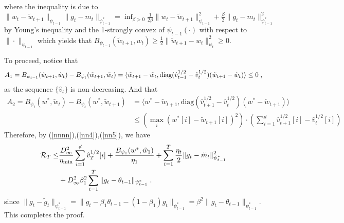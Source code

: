 \documentclass[11pt]{article}
\makeatletter
\renewenvironment{proof}[1][\proofname]{%
   \par\pushQED{\qed}\normalfont%
   \topsep6\p@\@plus6\p@\relax
   \trivlist\item[\hskip\labelsep\bfseries#1]%
   \ignorespaces
}{%
   \popQED\endtrivlist\@endpefalse
}
\theoremstyle{k}
\makeatother
\begin{document}
\begin{proof}
\begin{equation}
\begin{aligned}
\end{aligned}
\end{equation}
where the inequality is due to $ \| w_t - \tilde{w}_{t+1}   \|_{\psi_{t-1}} \| g_t - m_t  \|_{\psi_{t-1}^*} = \inf_{ \beta > 0 }   \frac{1}{2\beta} \| w_t - \tilde{w}_{t+1} \|_{\psi_{t-1}}^2 +  \frac{\beta}{2} \| g_t - m_t  \|_{\psi_{t-1}^*}^2$ by Young's inequality and the 1-strongly convex of $\psi_{t-1}(\cdot)$ with respect to $\| \cdot \|_{\psi_{t-1}}$ which yields that $B_{\psi_{t-1}}(\tilde{w}_{t+1}, w_t )  \geq \frac{1}{2} \| \tilde{w}_{t+1} -  w_t  \|^2_{\psi_t} \geq 0$. 

To proceed, notice that
\begin{equation} \label{nn5}
\begin{aligned}
A_1 =  B_{\psi_{t-1}}(\tilde{w}_{t+1}, \tilde{w}_{t}) - B_{\psi_t}(\tilde{w}_{t+1}, \tilde{w}_{t})  = \langle \tilde{w}_{t+1} - \tilde{w}_{t} , \text{diag}(\hat{v}_{t-1}^{1/2} -\hat{v}_t^{1/2} ) ( \tilde{w}_{t+1}- \tilde{w}_{t} ) \rangle \leq 0 \;,
\end{aligned}
\end{equation}
as the sequence $\{\hat{v}_t\}$ is non-decreasing. And that
\begin{equation}  \label{nn4}
\begin{aligned}
A_2 = B_{\psi_t}( w^*, \tilde{w}_{t}) -B_{\psi_t}(w^*,  \tilde{w}_{t+1} )  &= \langle w^* - \tilde{w}_{t+1}  , \text{diag}(\hat{v}_{t+1}^{1/2} -\hat{v}_t^{1/2} ) ( w^* - \tilde{w}_{t+1}  ) \rangle\\
  & \leq ( \max_i (w^*[i] -  \tilde{w}_{t+1} [i] )^2  )\cdot ( \sum_{i=1}^d \hat{v}_{t+1}^{1/2}[i] -\hat{v}_t^{1/2}[i] )
\end{aligned}
\end{equation}
Therefore, by (\ref{nnnn}),(\ref{nn4}),(\ref{nn5}), we have
\begin{equation}\notag
\begin{aligned}
\mathcal{R}_T \leq & \frac{D_{\infty}^2}{\eta_{\min}}  \sum_{i=1}^d \hat{v}_{T}^{1/2}[i] + \frac{ B_{\psi_1}(w^*, \tilde{w}_{1})}{\eta_1}
+ \sum_{t=1}^T\frac{\eta_t}{2} \| g_t - \tilde{m}_t  \|_{\psi_{t-1}^*}^2  \\
& +D_{\infty}^2 \beta_1^2  \sum_{t=1}^T \| g_t - \theta_{t-1}  \|_{\psi_{t-1}^*}  \;.
\end{aligned}
\end{equation}
since $  \| g_t - \tilde{g}_t  \|_{\psi_{t-1}^*} =  \| g_t - \beta_1 \theta_{t-1} -(1- \beta_1) g_t \|_{\psi_{t-1}^*} = \beta^2 \| g_t - \theta_{t-1}  \|_{\psi_{t-1}^*} $.
This completes the proof.

\end{proof}
\end{document}
